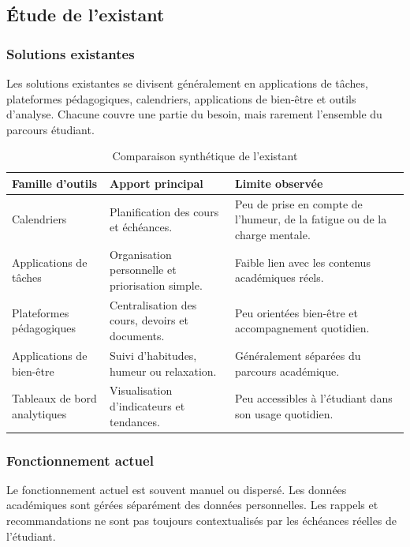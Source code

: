 \documentclass{rapportENSET}
\renewcommand{\arraystretch}{1.15}
\begin{document}
\subsection{Étude de l'existant}
\subsubsection*{Solutions existantes}
Les solutions existantes se divisent généralement en applications de tâches, plateformes pédagogiques, calendriers, applications de bien-être et outils d'analyse. Chacune couvre une partie du besoin, mais rarement l'ensemble du parcours étudiant.

\begin{table}[H]
\centering
\small
\renewcommand{\arraystretch}{1.25}
\begin{tabularx}{\textwidth}{@{}L{0.31\textwidth}Y Y@{}}
\toprule
\textbf{Famille d'outils} & \textbf{Apport principal} & \textbf{Limite observée} \\
\midrule
Calendriers & Planification des cours et échéances. & Peu de prise en compte de l'humeur, de la fatigue ou de la charge mentale. \\
Applications de tâches & Organisation personnelle et priorisation simple. & Faible lien avec les contenus académiques réels. \\
Plateformes pédagogiques & Centralisation des cours, devoirs et documents. & Peu orientées bien-être et accompagnement quotidien. \\
Applications de bien-être & Suivi d'habitudes, humeur ou relaxation. & Généralement séparées du parcours académique. \\
Tableaux de bord analytiques & Visualisation d'indicateurs et tendances. & Peu accessibles à l'étudiant dans son usage quotidien. \\
\bottomrule
\end{tabularx}
\caption{Comparaison synthétique de l'existant}
\end{table}

\subsubsection*{Fonctionnement actuel}
Le fonctionnement actuel est souvent manuel ou dispersé. Les données académiques sont gérées séparément des données personnelles. Les rappels et recommandations ne sont pas toujours contextualisés par les échéances réelles de l'étudiant.
\end{document}
